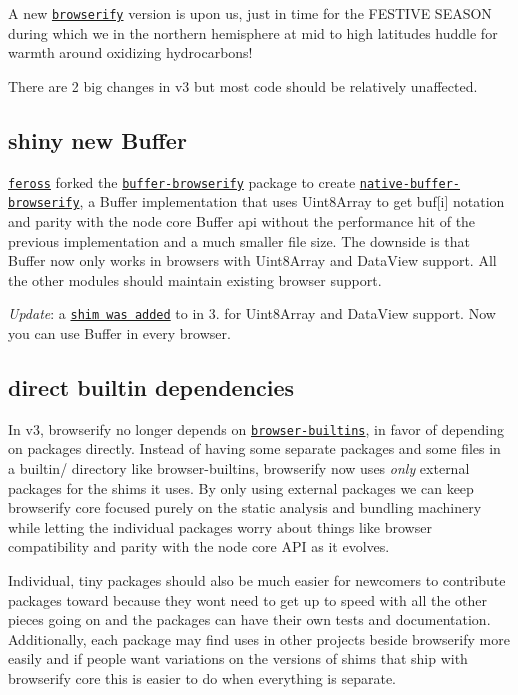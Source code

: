 A new \href{http://browserify.org}{\tt browserify} version is upon us, just in time for the F\+E\+S\+T\+I\+VE S\+E\+A\+S\+ON during which we in the northern hemisphere at mid to high latitudes huddle for warmth around oxidizing hydrocarbons!

There are 2 big changes in v3 but most code should be relatively unaffected.

\subsection*{shiny new Buffer}

\href{https://github.com/feross}{\tt feross} forked the \href{https://npmjs.org/package/buffer-browserify}{\tt buffer-\/browserify} package to create \href{https://npmjs.org/package/native-buffer-browserify}{\tt native-\/buffer-\/browserify}, a {\ttfamily Buffer} implementation that uses {\ttfamily Uint8\+Array} to get {\ttfamily buf\mbox{[}i\mbox{]}} notation and parity with the node core {\ttfamily Buffer} api without the performance hit of the previous implementation and a much smaller file size. The downside is that {\ttfamily Buffer} now only works in browsers with {\ttfamily Uint8\+Array} and {\ttfamily Data\+View} support. All the other modules should maintain existing browser support.

{\itshape Update}\+: a \href{https://npmjs.org/package/typedarray}{\tt shim was added} to in 3. for Uint8\+Array and Data\+View support. Now you can use {\ttfamily Buffer} in every browser.

\subsection*{direct builtin dependencies}

In v3, browserify no longer depends on \href{https://npmjs.org/package/browser-builtins}{\tt browser-\/builtins}, in favor of depending on packages directly. Instead of having some separate packages and some files in a {\ttfamily builtin/} directory like browser-\/builtins, browserify now uses {\itshape only} external packages for the shims it uses. By only using external packages we can keep browserify core focused purely on the static analysis and bundling machinery while letting the individual packages worry about things like browser compatibility and parity with the node core A\+PI as it evolves.

Individual, tiny packages should also be much easier for newcomers to contribute packages toward because they won\textquotesingle{}t need to get up to speed with all the other pieces going on and the packages can have their own tests and documentation. Additionally, each package may find uses in other projects beside browserify more easily and if people want variations on the versions of shims that ship with browserify core this is easier to do when everything is separate.

